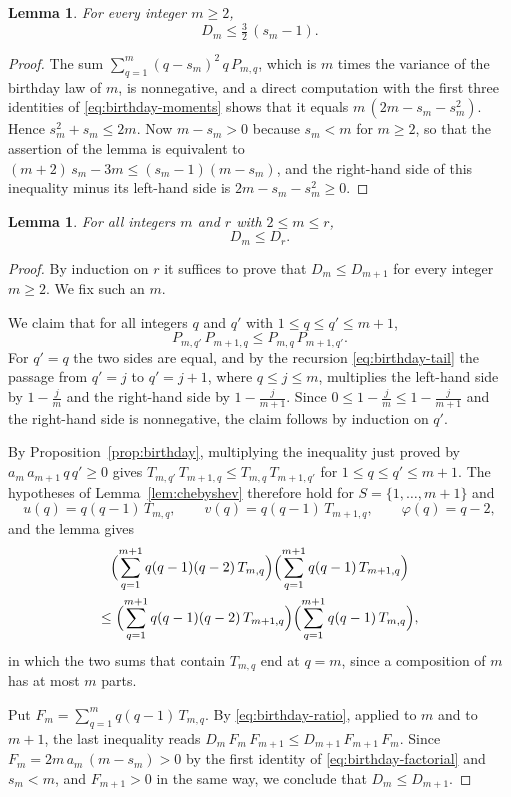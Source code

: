 \documentclass{amsart}
\newtheorem{lemma}[theorem]{Lemma}
\theoremstyle{definition}
\theoremstyle{remark}
\numberwithin{equation}{section}
\begin{document}
\begin{lemma}\label{lem:ratiobound}
For every integer $m\ge 2$,
\[
D_m\le\tfrac32\,(s_m-1).
\]
\end{lemma}

\begin{proof}
The sum $\sum_{q=1}^{m}(q-s_m)^2\,q\,P_{m,q}$, which is $m$ times the variance of the birthday law of $m$, is nonnegative, and a direct computation with the first three identities of \eqref{eq:birthday-moments} shows that it equals $m\,(2m-s_m-s_m^2)$. Hence $s_m^2+s_m\le 2m$. Now $m-s_m>0$ because $s_m<m$ for $m\ge 2$, so that the assertion of the lemma is equivalent to $(m+2)\,s_m-3m\le(s_m-1)(m-s_m)$, and the right-hand side of this inequality minus its left-hand side is $2m-s_m-s_m^2\ge 0$.
\end{proof}

\begin{lemma}\label{lem:ratiomonotone}
For all integers $m$ and $r$ with $2\le m\le r$,
\[
D_m\le D_r.
\]
\end{lemma}

\begin{proof}
By induction on $r$ it suffices to prove that $D_m\le D_{m+1}$ for every integer $m\ge 2$. We fix such an $m$.

We claim that for all integers $q$ and $q'$ with $1\le q\le q'\le m+1$,
\[
P_{m,q'}\,P_{m+1,q}\le P_{m,q}\,P_{m+1,q'}.
\]
For $q'=q$ the two sides are equal, and by the recursion \eqref{eq:birthday-tail} the passage from $q'=j$ to $q'=j+1$, where $q\le j\le m$, multiplies the left-hand side by $1-\frac jm$ and the right-hand side by $1-\frac{j}{m+1}$. Since $0\le 1-\frac jm\le 1-\frac{j}{m+1}$ and the right-hand side is nonnegative, the claim follows by induction on $q'$.

By Proposition~\ref{prop:birthday}, multiplying the inequality just proved by $a_m\,a_{m+1}\,q\,q'\ge 0$ gives $T_{m,q'}\,T_{m+1,q}\le T_{m,q}\,T_{m+1,q'}$ for $1\le q\le q'\le m+1$. The hypotheses of Lemma~\ref{lem:chebyshev} therefore hold for $S=\{1,\dots,m+1\}$ and
\[
u(q)=q(q-1)\,T_{m,q},\qquad v(q)=q(q-1)\,T_{m+1,q},\qquad\varphi(q)=q-2,
\]
and the lemma gives
\begin{multline*}
\Bigl(\sum_{q=1}^{m+1}q(q-1)(q-2)\,T_{m,q}\Bigr)\Bigl(\sum_{q=1}^{m+1}q(q-1)\,T_{m+1,q}\Bigr)\\
\le\Bigl(\sum_{q=1}^{m+1}q(q-1)(q-2)\,T_{m+1,q}\Bigr)\Bigl(\sum_{q=1}^{m+1}q(q-1)\,T_{m,q}\Bigr),
\end{multline*}
in which the two sums that contain $T_{m,q}$ end at $q=m$, since a composition of $m$ has at most $m$ parts.

Put $F_m=\sum_{q=1}^{m}q(q-1)\,T_{m,q}$. By \eqref{eq:birthday-ratio}, applied to $m$ and to $m+1$, the last inequality reads $D_m\,F_m\,F_{m+1}\le D_{m+1}\,F_{m+1}\,F_m$. Since $F_m=2m\,a_m\,(m-s_m)>0$ by the first identity of \eqref{eq:birthday-factorial} and $s_m<m$, and $F_{m+1}>0$ in the same way, we conclude that $D_m\le D_{m+1}$.
\end{proof}
\end{document}
